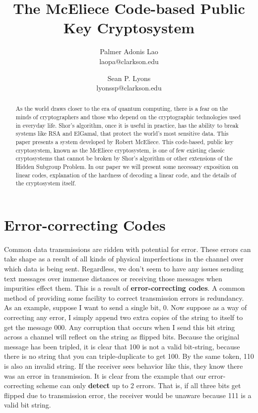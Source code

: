 \documentclass{article}
\title{The McEliece Code-based Public Key Cryptosystem}
\author{Palmer Adonis Lao\\
 laopa@clarkson.edu\\
\and
Sean P. Lyons\\
lyonssp@clarkson.edu\\}
\theoremstyle{definition}
\begin{document}
\maketitle


\begin{abstract}
As the world draws closer to the era of quantum computing, there is a fear on the minds of cryptographers and those who depend on the cryptographic technologies used in everyday life. Shor's algorithm, once it is useful in practice, has the ability to break systems like RSA and ElGamal, that protect the world's most sensitive data. This paper presents a system developed by Robert McEliece.  This code-based, public key cryptosystem, known as the McEliece cryptosystem, is one of few existing classic cryptosystems that cannot be broken by Shor's algorithm or other extensions of the Hidden Subgroup Problem.  In our paper we will present some necessary exposition on linear codes, explanation of the hardness of decoding a linear code, and the details of the cryptosystem itself.   
\end{abstract}

\newpage

\section{Error-correcting Codes}
\paragraph{} Common data transmissions are ridden with potential for error.  These errors can take shape as a result of all kinds of physical imperfections in the channel over which data is being sent.  Regardless, we don't seem to have any issues sending text messages over immense distances or receiving those messages when impurities effect them.  This is a result of \textbf{error-correcting codes}.  A common method of providing some facility to correct transmission errors is redundancy.  As an example, suppose I want to send a single bit, 0.  Now suppose as a way of correcting any error, I simply append two extra copies of the string to itself to get the message 000.  Any corruption that occurs when I send this bit string across a channel will reflect on the string as flipped bits.  Because the original message has been tripled, it is clear that 100 is not a valid bit-string, because there is no string that you can triple-duplicate to get 100.  By the same token, 110 is also an invalid string.  If the receiver sees behavior like this, they know there was an error in transmission.  It is clear from the example that our error-correcting scheme can only \textbf{detect} up to 2 errors.  That is, if all three bits get flipped due to transmission error, the receiver would be unaware because 111 is a valid bit string.  \\
\end{document}
